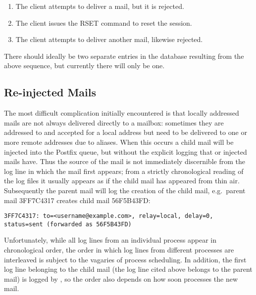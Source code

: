 \begin{enumerate}

    \item The client attempts to deliver a mail, but it is rejected.

    \item The client issues the RSET command to reset the 
        session.

    \item The client attempts to deliver another mail, likewise rejected.

\end{enumerate}

There should ideally be two separate entries in the database resulting from
the above sequence, but currently there will only be one.



\subsection{Re-injected Mails}

\label{Re-injected mails}

\label{tracking re-injected mail}

The most difficult complication initially encountered is that locally
addressed mails are not always delivered directly to a mailbox: sometimes
they are addressed to and accepted for a local address but need to be
delivered to one or more remote addresses due to aliases.  When this
occurs a child mail will be injected into the Postfix queue, but without
the explicit logging that  or  injected
mails have.  Thus the source of the mail is not immediately discernible
from the log line in which the mail first appears; from a strictly
chronological reading of the log files it usually appears as if the child
mail has appeared from thin air.  Subsequently the parent mail will log the
creation of the child mail, e.g.\ parent mail 3FF7C4317 creates child mail
56F5B43FD\@:

\texttt{3FF7C4317: to=<username@example.com>, relay=local, \newline{}
\tab{} delay=0, status=sent (forwarded as 56F5B43FD)}

Unfortunately, while all log lines from an individual process appear in
chronological order, the order in which log lines from different processes
are interleaved is subject to the vagaries of process scheduling.  In
addition, the first log line belonging to the child mail (the log line
cited above belongs to the parent mail) is logged by , so the
order also depends on how soon  processes the new mail.

